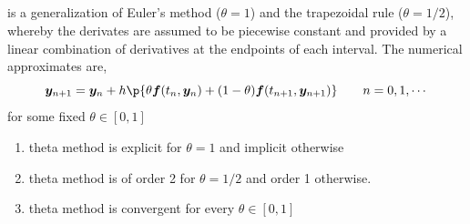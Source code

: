 \documentclass[11pt]{article}
\begin{document}
\subsection{}

\begin{definition*}
     is a generalization of Euler's method ($\theta=1$) and the trapezoidal rule ($\theta = 1/2$), whereby the derivates are assumed to be piecewise constant and provided by a linear combination of derivatives at the endpoints of each interval. The numerical approximates are,
    \[
        \by_{n+1} = \by_n + h\p{
            \theta \bf(t_n, \by_n) + (1-\theta) \bf(t_{n+1}, \by_{n+1})
        }
        \quad \quad n = 0,1,\cdots
    \]
    for some fixed $\theta \in [0,1]$
    \begin{enumerate}
        \item {} theta method is explicit for $\theta=1$ and implicit otherwise
        \item {} theta method is of order 2 for $\theta=1/2$ and order 1 otherwise.
        \item {} theta method is convergent for every $\theta \in [0,1]$
    \end{enumerate}
\end{definition*}



\section{}



\section{}

\subsection{}
\end{document}
